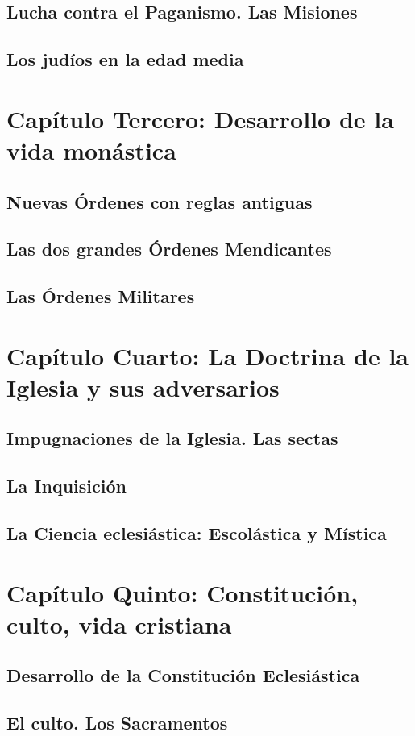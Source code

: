 \raggedbottom{} \documentclass[12pt, a4paper]{book}
\begin{document}
\section{Lucha contra el Paganismo. Las Misiones}
\section{Los judíos en la edad media}
\chapter{Capítulo Tercero: Desarrollo de la vida monástica}
\section{Nuevas Órdenes con reglas antiguas}
\section{Las dos grandes Órdenes Mendicantes}
\section{Las Órdenes Militares}
\chapter{Capítulo Cuarto: La Doctrina de la Iglesia y sus adversarios}
\section{Impugnaciones de la Iglesia. Las sectas}
\section{La Inquisición}
\section{La Ciencia eclesiástica: Escolástica y Mística}
\chapter{Capítulo Quinto: Constitución, culto, vida cristiana}
\section{Desarrollo de la Constitución Eclesiástica}
\section{El culto. Los Sacramentos}
\end{document}
